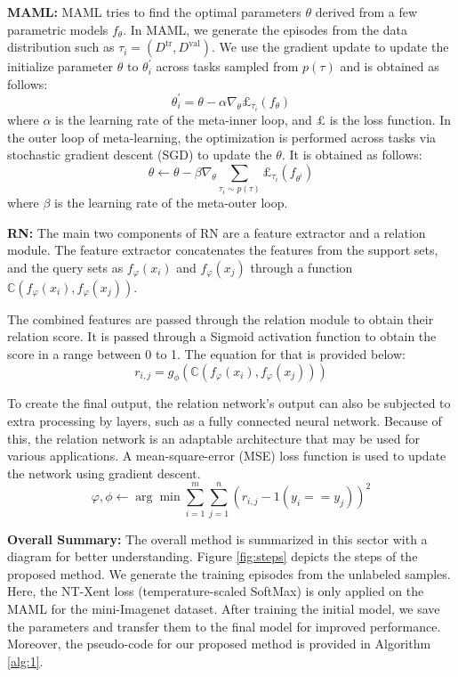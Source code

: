 \textbf{MAML:} MAML tries to find the optimal parameters $\theta$ derived from a few parametric models $f_{\theta }$. In MAML, we generate the episodes from the data distribution such as $\tau_{i}=(D^{\textrm{tr}},D^{\textrm{val}})$. We use the gradient update to update the initialize parameter $\theta$ to $\theta_{i}^{'}$  across tasks sampled from $p(\tau)$ and is obtained as follows:
\begin{equation}
\theta_{i}^{'}=\theta -\alpha \nabla_{\theta}\pounds_{\tau_{i}}(f_{\theta})
\end{equation}
\noindent where $\alpha$ is the learning rate of the meta-inner loop, and $\pounds$ is the loss function.
In the outer loop of meta-learning, the optimization is performed across tasks via stochastic gradient descent (SGD) to update the $\theta$. It is obtained as follows:
\begin{equation}
\theta\leftarrow \theta -\beta \nabla_{\theta }\sum_{\tau_{i}\sim p(\tau)}\pounds_{\tau_{i}}(f_{\theta^{i}})
\end{equation}
\noindent where $\beta$ is the learning rate of the meta-outer loop.

\textbf{RN:} The main two components of RN are a feature extractor and a relation module. The feature extractor concatenates the features from the support sets, and the query sets as $f_{\varphi}(x_{i})$ and $f_{\varphi}(x_{j})$ through a function $\mathbb{C}(f_{\varphi}(x_{i}),f_{\varphi}(x_{j}))$. 

The combined features are passed through the relation module to obtain their relation score. It is passed through a Sigmoid activation function to obtain the score in a range between 0 to 1. The equation for that is provided below:
\begin{equation}
r_{i,j}=g_{\phi}(\mathbb{C}(f_{\varphi}(x_{i}),f_{\varphi}(x_{j})))
\end{equation}

To create the final output, the relation network's output can also be subjected to extra processing by layers, such as a fully connected neural network. Because of this, the relation network is an adaptable architecture that may be used for various applications. A mean-square-error (MSE) loss function is used to update the network using gradient descent. 
\begin{equation}
\varphi,\phi\leftarrow \arg\min \sum_{i=1}^{m}\sum_{j=1}^{n}(r_{i,j}-1(y_{i}==y_{j}))^{2}
\end{equation}

\textbf{Overall Summary:} The overall method is summarized in this sector with a diagram for better understanding. Figure \ref{fig:steps} depicts the steps of the proposed method. We generate the training episodes from the unlabeled samples. Here, the NT-Xent loss \cite{sohn2016improved} (temperature-scaled SoftMax) is only applied on the MAML for the mini-Imagenet dataset. After training the initial model, we save the parameters and transfer them to the final model for improved performance. Moreover, the pseudo-code for our proposed method is provided in Algorithm \ref{alg:1}.


